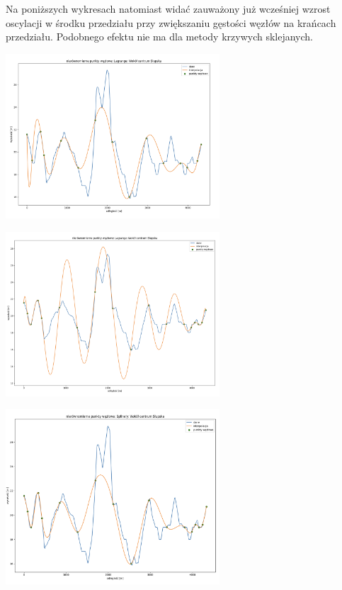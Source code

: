 \documentclass{article}
\begin{document}
Na poniższych wykresach natomiast widać zauważony już wcześniej wzrost oscylacji w środku przedziału przy zwiększaniu gęstości węzłów na krańcach przedziału.
Podobnego efektu nie ma dla metody krzywych sklejanych.
 \begin{center}
	\includegraphics[width=8cm]{lagrange_slupsk_krance1}
\end{center}
 \begin{center}
	\includegraphics[width=8cm]{lagrange_slupsk_krance2}
\end{center}
 \begin{center}
	\includegraphics[width=8cm]{spline_slupsk_krance}
\end{center}
\end{document}
